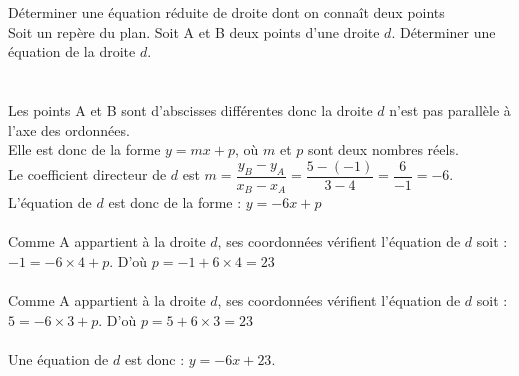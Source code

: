\documentclass[11pt,a4paper]{article}  %
\begin{document}
\begin{methodeTitre}{Déterminer une équation réduite de droite dont on connaît deux points}
\\
Soit \Rij un repère du plan. Soit A et B deux points d'une droite $d$.
Déterminer une équation de la droite $d$.\\
\ \\
\\
Les points A et B sont d'abscisses différentes donc la droite $d$ n'est pas parallèle à l'axe des ordonnées.\\ Elle est donc de la forme $y = mx + p$, où $m$ et $p$ sont deux nombres réels.\\
Le coefficient directeur de $d$ est $m =  \dfrac{y_B-y_A}{x_B-x_A}=\dfrac{5-(-1)}{3-4}=\dfrac{6}{-1} = -6$.\\
L'équation de $d$ est donc de la forme : $y = -6x + p$\\
\\
Comme A appartient à la droite $d$, ses coordonnées vérifient l'équation de $d$ soit :\\
$-1 = -6 \times 4 + p$. D'où  $p = -1 + 6 \times 4 = 23$\\
\\
Comme A appartient à la droite $d$, ses coordonnées vérifient l'équation de $d$ soit :\\
$5 = -6 \times 3 + p$. D'où  $p = 5 + 6 \times 3 = 23$\\
\ \\
Une équation de $d$ est donc :  $y = - 6x + 23$.
\end{methodeTitre}
\end{document}
